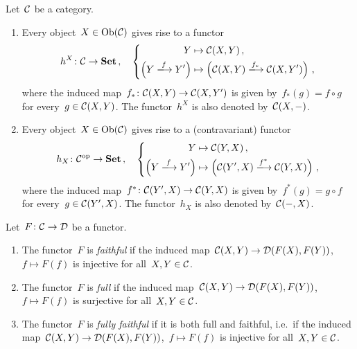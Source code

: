 \begin{example}
  Let~$\mathcal{C}$ be a category.
  \begin{enumerate}
    \item
      Every object~$X \in \operatorname{Ob}(\mathcal{C})$ gives rise to a functor
      \[
                h^X
        \colon  \Ccat
        \to     \Set \,,
        \quad   \left\{
                  \begin{aligned}
                              Y
                    &\mapsto  \Ccat(X,Y) \,,
                    \\
                              \left( Y \xlongto{f} Y' \right)
                    &\mapsto  \left( \Ccat(X,Y) \xlongto{f_*} \Ccat(X,Y') \right) \,,
                  \end{aligned}
                \right.
      \]
      where the induced map~$f_* \colon \mathcal{C}(X,Y) \to \mathcal{C}(X,Y')$ is given by~$f_*(g) = f \circ g$ for every~$g \in \mathcal{C}(X,Y)$.
      The functor~$h^X$ is also denoted by~$\mathcal{C}(X,-)$.
    \item
      Every object~$X \in \operatorname{Ob}(\mathcal{C})$ gives rise to a (contravariant) functor
      \[
                h_X
        \colon  \Ccat^\op
        \to     \Set \,,
        \quad   \left\{
                  \begin{aligned}
                              Y
                    &\mapsto  \Ccat(Y,X) \,,
                    \\
                              \left( Y \xlongto{f} Y' \right)
                    &\mapsto  \left( \Ccat(Y',X) \xlongto{f^*} \Ccat(Y,X) \right) \,,
                  \end{aligned}
                \right.
      \]
      where the induced map~$f^* \colon \mathcal{C}(Y',X) \to \mathcal{C}(Y,X)$ is given by~$f^*(g) = g \circ f$ for every~$g \in \mathcal{C}(Y',X)$.
      The functor~$h_X$ is also denoted by~$\mathcal{C}(-,X)$.
  \end{enumerate}
\end{example}


\begin{definition}[label=properties of functors]
  Let~$F \colon \mathcal{C} \to \mathcal{D}$ be a functor.
  \begin{enumerate}
    \item
      The functor~$F$ is \emph{faithful} if the induced map~$\mathcal{C}(X,Y) \to \mathcal{D}(F(X),F(Y))$,~$f \mapsto F(f)$ is injective for all~$X, Y \in \mathcal{C}$.
    \item
      The functor~$F$ is \emph{full} if the induced map~$\mathcal{C}(X,Y) \to \mathcal{D}(F(X),F(Y))$,~$f \mapsto F(f)$ is surjective for all~$X, Y \in \mathcal{C}$.
    \item
      The functor~$F$ is \emph{fully faithful} if it is both full and faithful, i.e.\ if the induced map~$\mathcal{C}(X,Y) \to \mathcal{D}(F(X),F(Y))$,~$f \mapsto F(f)$ is injective for all~$X, Y \in \mathcal{C}$.
  \end{enumerate}
\end{definition}




